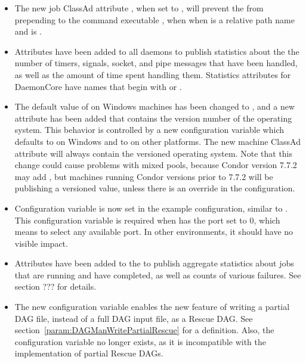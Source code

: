\begin{itemize}

\item The new job ClassAd attribute , 
when set to , will prevent the  from 
prepending  to the command executable , when
when  is a relative path name and  
is .

\item Attributes have been added to all daemons to publish statistics 
about the the number of timers, signals, socket, and pipe messages 
that have been handled, as well as the amount of time spent handling them.	Statistics attributes for DaemonCore
have names that begin with  or .

\item The default value of  on Windows machines has been changed
to , and a new attribute  has been added 
that contains the version number of the operating system.  
This behavior is controlled by a new configuration variable
 which defaults to  on Windows 
and to  on other platforms.  
The new machine ClassAd attribute  will always contain 
the versioned operating system.  
Note that this change could cause problems with mixed pools,
because Condor version 7.7.2  may add , 
but machines running Condor versions prior to 7.7.2 will be publishing 
a versioned  value,
unless there is an override in the configuration.

\item Configuration variable  is now set 
in the example configuration,
similar to .
This configuration variable is required when  
has the port set to 0, which means to select any available port.
In other environments, it should have no visible impact.

\item Attributes have been added to the  
to publish aggregate statistics
about jobs that are running and have completed, as well as counts of various
failures. See section ??? for details.

\item The new configuration variable 
enables the new feature of writing a partial DAG file, instead of a full
DAG input file, as a Rescue DAG.  
See section~\ref{param:DAGManWritePartialRescue} for a definition.
Also, the configuration variable
 no longer exists,
as it is incompatible with the implementation of partial Rescue DAGs.

\end{itemize}

